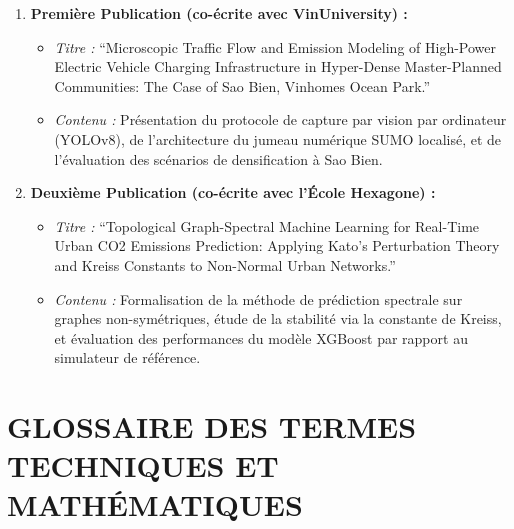 \documentclass[10pt, a4paper]{article}
\providecommand{\tightlist}{}
\begin{document}
\begin{enumerate}
\def\labelenumi{\arabic{enumi}.}
\tightlist
\item
  \textbf{Première Publication (co-écrite avec VinUniversity) :}

  \begin{itemize}
  \tightlist
  \item
    \emph{Titre :} ``Microscopic Traffic Flow and Emission Modeling of
    High-Power Electric Vehicle Charging Infrastructure in Hyper-Dense
    Master-Planned Communities: The Case of Sao Bien, Vinhomes Ocean
    Park.''
  \item
    \emph{Contenu :} Présentation du protocole de capture par vision par
    ordinateur (YOLOv8), de l'architecture du jumeau numérique SUMO
    localisé, et de l'évaluation des scénarios de densification à Sao
    Bien.
  \end{itemize}
\item
  \textbf{Deuxième Publication (co-écrite avec l'École Hexagone) :}

  \begin{itemize}
  \tightlist
  \item
    \emph{Titre :} ``Topological Graph-Spectral Machine Learning for
    Real-Time Urban CO2 Emissions Prediction: Applying Kato's
    Perturbation Theory and Kreiss Constants to Non-Normal Urban
    Networks.''
  \item
    \emph{Contenu :} Formalisation de la méthode de prédiction spectrale
    sur graphes non-symétriques, étude de la stabilité via la constante
    de Kreiss, et évaluation des performances du modèle XGBoost par
    rapport au simulateur de référence.
  \end{itemize}
\end{enumerate}

\newpage

\section{GLOSSAIRE DES TERMES TECHNIQUES ET
MATHÉMATIQUES}\label{glossaire-des-termes-techniques-et-mathuxe9matiques}
\end{document}
